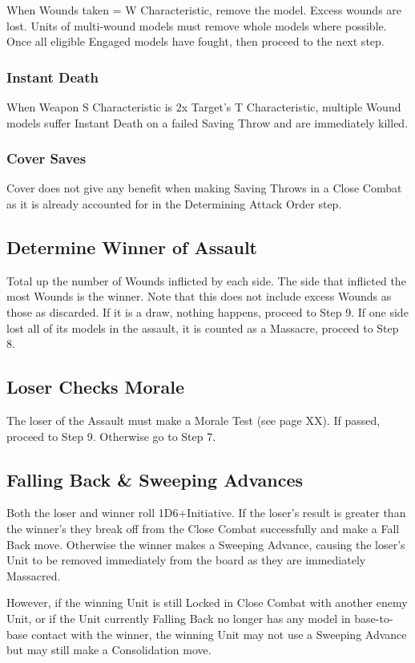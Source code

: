 When Wounds taken = W Characteristic, remove the model.
Excess wounds are lost. Units of multi-wound models must
remove whole models where possible. Once all eligible
Engaged models have fought, then proceed to the next step.

\subsubsection{Instant Death}
When Weapon S Characteristic is 2x Target's T Characteristic,
multiple Wound models suffer Instant Death on a failed Saving
Throw and are immediately killed.

\subsubsection{Cover Saves}
Cover does not give any benefit when making Saving Throws
in a Close Combat as it is already accounted for in the
Determining Attack Order step.

\subsection{Determine Winner of Assault}
Total up the number of Wounds inflicted by each side. The side
that inflicted the most Wounds is the winner. Note that this
does not include excess Wounds as those as discarded. If it is
a draw, nothing happens, proceed to Step 9. If one side lost all
of its models in the assault, it is counted as a Massacre,
proceed to Step 8.

\subsection{Loser Checks Morale}
The loser of the Assault must make a Morale Test (see page
XX). If passed, proceed to Step 9. Otherwise go to Step 7.

\subsection{Falling Back \& Sweeping Advances}
Both the loser and winner roll 1D6+Initiative. If the loser's
result is greater than the winner’s they break off from the Close
Combat successfully and make a Fall Back move. Otherwise
the winner makes a Sweeping Advance, causing the loser’s
Unit to be removed immediately from the board as they are
immediately Massacred.

However, if the winning Unit is still Locked in Close Combat
with another enemy Unit, or if the Unit currently Falling Back
no longer has any model in base-to-base contact with the
winner, the winning Unit may not use a Sweeping Advance but
may still make a Consolidation move.

